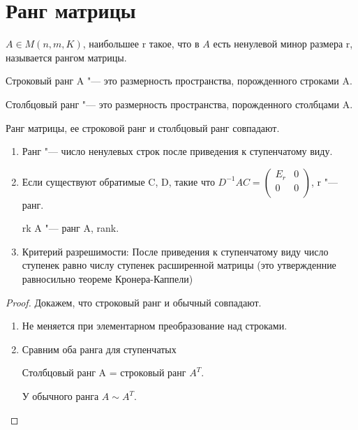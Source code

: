 ﻿\section{Ранг матрицы}
\begin{Def}
$A \in M(n, m, K)$, наибольшее r такое, что в $A$ есть ненулевой минор размера r, называется рангом матрицы. 
\end{Def}

\begin{Def}
Строковый ранг A "--- это размерность пространства, 
порожденного строками A.
\end{Def}

\begin{Def}
Столбцовый ранг "--- это размерность пространства, порожденного столбцами A.
\end{Def}

\begin{theorem}{}
Ранг матрицы, ее строковой ранг и столбцовый ранг совпадают.
\end{theorem}

\begin{Rem}
\begin{enumerate}
\item Ранг "--- число ненулевых строк после приведения к ступенчатому виду. 
\item Если существуют обратимые C, D, такие что $D^{-1}AC = 
\begin{pmatrix}
E_r&0\\
0&0\\
\end{pmatrix}$, r "--- ранг.

rk A "--- ранг A, rank.
\item Критерий разрешимости:
После приведения к ступенчатому виду число ступенек равно числу ступенек расширенной матрицы
(это утвержденние равносильно теореме Кронера-Каппели)
\end{enumerate}
\end{Rem}

\begin{proof}
Докажем, что строковый ранг и обычный совпадают. 
\begin{enumerate}
\item Не меняется при элементарном преобразование над строками.
\item Сравним оба ранга для ступенчатых

Столбцовый ранг A = строковый ранг $A^{T}$.

У обычного ранга $A \sim A^{T}$.

\end{enumerate}
\end{proof}